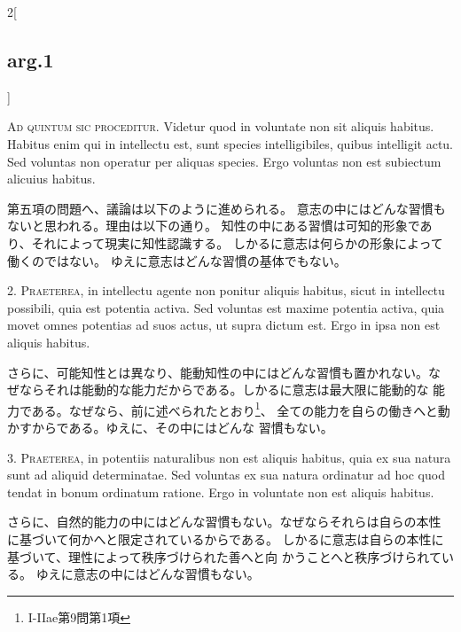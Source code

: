\documentclass[paper=a4paper,fontsize=10pt,jafontsize=9pt,titlepage]{jlreq}
\begin{document}
\begin{paracol}{2}[\subsection{arg.1}]

{\scshape Ad quintum sic proceditur}. Videtur quod in voluntate non
sit aliquis habitus. Habitus enim qui in intellectu est, sunt species
intelligibiles, quibus intelligit actu. Sed voluntas non operatur per
aliquas species. Ergo voluntas non est subiectum alicuius habitus.

\switchcolumn

第五項の問題へ、議論は以下のように進められる。
意志の中にはどんな習慣もないと思われる。理由は以下の通り。
知性の中にある習慣は可知的形象であり、それによって現実に知性認識する。
しかるに意志は何らかの形象によって働くのではない。
ゆえに意志はどんな習慣の基体でもない。


2. {\scshape Praeterea}, in intellectu agente non ponitur aliquis habitus, sicut in
 intellectu possibili, quia est potentia activa. Sed voluntas est
 maxime potentia activa, quia movet omnes potentias ad suos actus, ut
 supra dictum est. Ergo in ipsa non est aliquis habitus.

\switchcolumn

さらに、可能知性とは異なり、能動知性の中にはどんな習慣も置かれない。な
 ぜならそれは能動的な能力だからである。しかるに意志は最大限に能動的な
 能力である。なぜなら、前に述べられたとおり\footnote{I-IIae第9問第1項}、
 全ての能力を自らの働きへと動かすからである。ゆえに、その中にはどんな
 習慣もない。


3. {\scshape Praeterea}, in potentiis naturalibus non est aliquis habitus, quia ex
 sua natura sunt ad aliquid determinatae. Sed voluntas ex sua natura
 ordinatur ad hoc quod tendat in bonum ordinatum ratione. Ergo in
 voluntate non est aliquis habitus.

\switchcolumn

さらに、自然的能力の中にはどんな習慣もない。なぜならそれらは自らの本性
 に基づいて何かへと限定されているからである。
しかるに意志は自らの本性に基づいて、理性によって秩序づけられた善へと向
 かうことへと秩序づけられている。
ゆえに意志の中にはどんな習慣もない。


\end{paracol}
\end{document}
